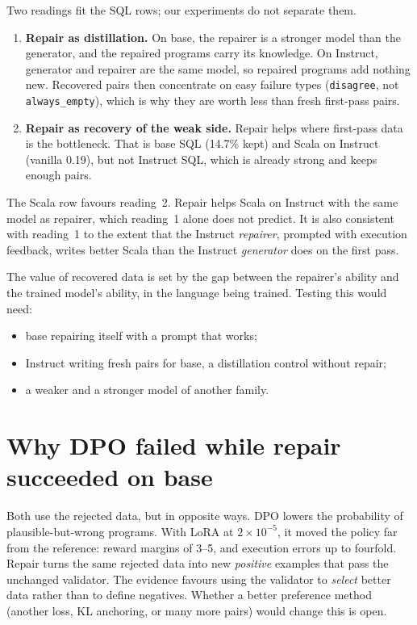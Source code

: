 \begin{interpretation}
Two readings fit the SQL rows; our experiments do not separate them.
\begin{enumerate}
\item \textbf{Repair as distillation.} On base, the repairer is a stronger model than the generator, and the repaired
programs carry its knowledge. On Instruct, generator and repairer are the same model, so repaired programs add nothing
new. Recovered pairs then concentrate on easy failure types (\texttt{disagree}, not \texttt{always\_empty}), which is
why they are worth less than fresh first-pass pairs.
\item \textbf{Repair as recovery of the weak side.} Repair helps where first-pass data is the bottleneck. That is base
SQL (14.7\% kept) and Scala on Instruct (vanilla \ZSiv{} 0.19), but not Instruct SQL, which is already strong and keeps
enough pairs.
\end{enumerate}
The Scala row favours reading~2. Repair helps Scala on Instruct with the same model as repairer, which reading~1 alone
does not predict. It is also consistent with reading~1 to the extent that the Instruct \emph{repairer}, prompted with
execution feedback, writes better Scala than the Instruct \emph{generator} does on the first pass.
\end{interpretation}

\begin{hypothesis}
The value of recovered data is set by the gap between the repairer's ability and the trained model's ability, in the
language being trained. Testing this would need:
\begin{itemize}
\item base repairing itself with a prompt that works;
\item Instruct writing fresh pairs for base, a distillation control without repair;
\item a weaker and a stronger model of another family.
\end{itemize}
\end{hypothesis}

\section{Why DPO failed while repair succeeded on base}

Both use the rejected data, but in opposite ways. DPO lowers the probability of plausible-but-wrong programs. With
LoRA at $2\times10^{-5}$, it moved the policy far from the reference: reward margins of 3--5, and execution errors up
to fourfold. Repair turns the same rejected data into new \emph{positive} examples that pass the unchanged validator.
The evidence favours using the validator to \emph{select} better data rather than to define negatives. Whether a better
preference method (another loss, KL anchoring, or many more pairs) would change this is open.

